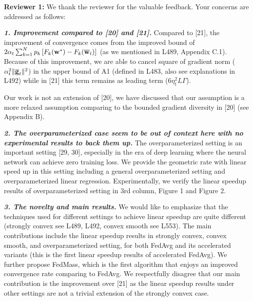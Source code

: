 {\color{blue}\textbf{Reviewer 1:}} We thank the reviewer for the valuable feedback. Your concerns are addressed as follows: 

\textbf{\textit{1. Improvement compared to [20] and [21].}} Compared to [21], the improvement 
of convergence comes from the improved bound of $2\alpha_{t}\sum_{k=1}^{N}p_{k}\left[F_{k}({\mathbf{w}}^{\ast})-F_{k}({\overline{\mathbf{w}}}_{t})\right]$ (as we mentioned in L489, Appendix C.1). Because of this improvement, we are able to cancel square of gradient norm ($\alpha_{t}^{2}\|{\overline{\mathbf{g}}}_{t}\|^{2}$) in the upper bound of A1 (defined in L483, also see explanations in L492) while in [21] this term remains as leading term ($6\eta_t^2L \Gamma$). 

Our work is not an extension of [20], we have discussed that our assumption is
a more relaxed assumption comparing to the bounded gradient diversity in [20] (see Appendix B). 

\textbf{\textit{2. The overparameterized case seem to be out of context here with no experimental results to back them up.}} The overparameterized 
setting is an important setting [29, 30], especially in the era of deep learning
where the neural network can achieve zero training loss. We provide the 
geometric rate with linear speed up in this setting including a general overparameterized setting and overparameterized linear regression. 
Experimentally, we verify the linear speedup results of overparameterized setting in 3rd column, Figure 1 and Figure 2. 

\textbf{\textit{3. The novelty and main results.}}
We would like to emphasize that the techniques used for different settings
to achieve linear speedup are quite different (strongly convex see L489, L492, convex smooth see L553). The main contributions include
the linear speedup results in strongly convex, convex smooth, and overparameterized
setting, for both FedAvg and its accelerated variants (this is the first linear speedup results of accelerated FedAvg). We further propose FedMass,
which is the first algorithm that enjoys an improved convergence rate comparing to
FedAvg. We respectfully disagree that our main contribution is the improvement over [21] as the linear speedup results under other settings are not a trivial extension of the strongly convex case.

